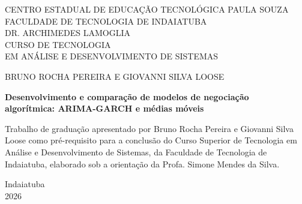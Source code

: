\begin{folhaderosto}
\thispagestyle{empty}
\center

{\fontsize{14}{22}\selectfont
\MakeUppercase{Centro Estadual de Educação Tecnológica Paula Souza}\\
\MakeUppercase{Faculdade de Tecnologia de Indaiatuba}\\
\MakeUppercase{Dr. Archimedes Lamoglia}\\
\MakeUppercase{Curso de Tecnologia}\\
\MakeUppercase{em Análise e Desenvolvimento de Sistemas}\par}

\vspace{0.12\textheight}

{\fontsize{14}{18}\selectfont
\MakeUppercase{Bruno Rocha Pereira e Giovanni Silva Loose}\par}

\vfill

{\bfseries\fontsize{16}{20}\selectfont
Desenvolvimento e comparação de modelos de negociação\\
algorítmica: ARIMA-GARCH e médias móveis\par}

\vspace{\onelineskip}

\hfill\begin{minipage}{\dimexpr\textwidth-7cm\relax}
\SingleSpacing\fontsize{12}{14}\selectfont
Trabalho de graduação apresentado por Bruno Rocha Pereira e
Giovanni Silva Loose como pré-requisito para a conclusão do Curso Superior
de Tecnologia em Análise e Desenvolvimento de Sistemas, da Faculdade de
Tecnologia de Indaiatuba, elaborado sob a orientação da Profa. Simone
Mendes da Silva.
\end{minipage}

\vfill

{\fontsize{14}{18}\selectfont
Indaiatuba\\
2026\par}

\end{folhaderosto}

